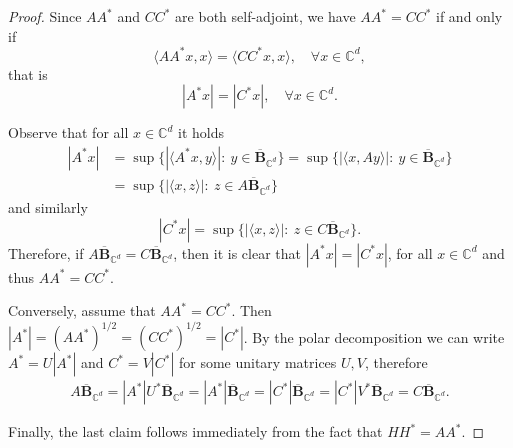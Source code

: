 \documentclass{article}
\theoremstyle{definition}
\theoremstyle{remark}
\numberwithin{equation}{section}
\newcommand{\complex}{\mathbb{C}}
\newcommand{\1}{\mathbf{1}}
\begin{document}
    \begin{proof}
        Since $AA^{\ast}$ and $CC^{\ast}$ are both self-adjoint, we have $AA^{\ast}=CC^{\ast}$ if and only if
        \begin{equation*}
            \langle AA^{\ast}x,x\rangle = \langle CC^{\ast}x,x\rangle,\quad\forall x\in\complex^{d},
        \end{equation*}
        that is
        \begin{equation*}
            |A^{\ast}x|=|C^{\ast}x|,\quad\forall x\in\complex^{d}.
        \end{equation*}
        
        Observe that for all $x\in\complex^{d}$ it holds
        \begin{align*}
            |A^{\ast}x| &= \sup\{|\langle A^{\ast}x,y\rangle|:~y\in\mathbf{\overline{B}}_{\complex^{d}}\}
            = \sup\{|\langle x,Ay\rangle|:~y\in\mathbf{\overline{B}}_{\complex^{d}}\}\\
            &= \sup\{|\langle x,z\rangle|:~z\in A\mathbf{\overline{B}}_{\complex^{d}}\}
        \end{align*}
        and similarly
        \begin{equation*}
            |C^{\ast}x| 
            = \sup\{|\langle x,z\rangle|:~z\in C\mathbf{\overline{B}}_{\complex^{d}}\}.
        \end{equation*}
        Therefore, if $A\mathbf{\overline{B}}_{\complex^{d}} = C\mathbf{\overline{B}}_{\complex^{d}}$, then it is clear that $|A^{\ast}x|=|C^{\ast}x|$, for all $x\in\complex^{d}$ and thus $AA^{\ast}=CC^{\ast}$.
        
        Conversely, assume that $AA^{\ast}=CC^{\ast}$. Then $|A^{\ast}|=(AA^{\ast})^{1/2}=(CC^{\ast})^{1/2}=|C^{\ast}|$. By the polar decomposition we can write $A^{\ast}=U|A^{\ast}|$ and $C^{\ast}=V|C^{\ast}|$ for some unitary matrices $U,V$, therefore
        \begin{align*}
            A\mathbf{\overline{B}}_{\complex^{d}}=
            |A^{\ast}|U^{\ast}\mathbf{\overline{B}}_{\complex^{d}}
            =|A^{\ast}|\mathbf{\overline{B}}_{\complex^{d}}
            =|C^{\ast}|\mathbf{\overline{B}}_{\complex^{d}}
            =|C^{\ast}|V^{\ast}\mathbf{\overline{B}}_{\complex^{d}}
            =C\mathbf{\overline{B}}_{\complex^{d}}.
        \end{align*}

        Finally, the last claim follows immediately from the fact that $HH^{\ast}=AA^{\ast}$.
    \end{proof}
    
\end{document}
